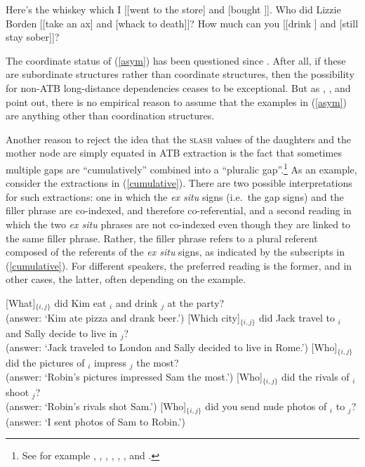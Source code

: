 \documentclass[output=paper
 	        ,biblatex
                ,babelshorthands
                ,newtxmath
                ,draftmode
                ,colorlinks, citecolor=brown
]{langscibook}
\begin{document}
\eal  \label{asym}
\ex
 Here's the whiskey  which I [[went to the store] and [bought \spc]].
\ex Who did Lizzie Borden [[take an ax] and [whack \spcs to death]]?
\ex How much can you [[drink \spc] and [still stay sober]]?
\zl


\noindent
The coordinate status of (\ref{asym}) has been questioned since . After all, if these
are subordinate structures rather than coordinate structures, then the possibility for non-ATB
long-distance dependencies ceases to be exceptional. But as \citet{schmerling72}, \citet{lakoff86},
\citet{levinepostal} and \citet[Chapter~5]{kehler} point out, there is no empirical reason to assume that the
examples in (\ref{asym}) are anything other than coordination structures.

Another reason to reject the idea that  the \textsc{slash} values of the daughters and the mother node
are simply equated in ATB extraction is the fact that sometimes multiple gaps are ``cumulatively''
combined into a ``pluralic gap''.\footnote{See for example  \citet{munn98atb,munn99atb},  \citet[136,
  160]{postal98}, \citet[125]{kehler}, \citet{gawronkehlersalt}, 
 \citet{zhang}, \citet{chavessubjexp}, and \citet{Vicente2016-NELS46}.}
As an example, consider the extractions in (\ref{cumulative}). There are two possible interpretations
for such extractions: one in which the \emph{ex situ} signs (i.e.\ the gap signs) and the filler
phrase are co-indexed, and therefore co-referential, and a second reading in which the two \emph{ex
  situ} phrases are not co-indexed even though they are linked to the same filler phrase.  Rather,
the filler phrase refers to a plural referent composed of the referents of the \emph{ex situ} signs,
as indicated by the subscripts in (\ref{cumulative}). For different speakers, the preferred reading
is the former, and in other cases, the latter, often depending on the example.

\eal \label{cumulative}
\ex
{}[What]$_{\lbrace i,j \rbrace}$ did Kim eat \trace$_i$ and drink \trace$_j$ at the party?\\
(answer: `Kim ate pizza and drank beer.')
\ex {}[Which city]$_{\lbrace i,j \rbrace}$ did Jack travel to \trace$_i$ and Sally decide to live in \trace$_j$?\\
(answer: `Jack traveled to London and Sally decided to live in Rome.')
\ex {}[Who]$_{\lbrace i,j \rbrace}$ did the pictures of \trace$_i$ impress \trace$_j$ the most?\\
(answer: `Robin's pictures impressed Sam the most.')
\ex {}[Who]$_{\lbrace i,j \rbrace}$ did the rivals of \trace$_i$ shoot \trace$_j$?\\
(answer: `Robin's rivals shot Sam.')
\ex {}[Who]$_{\lbrace i,j \rbrace}$ did you send nude photos of \trace$_i$ to \trace$_j$?\\
(answer: `I sent photos of Sam to Robin.')
\zl
\end{document}
